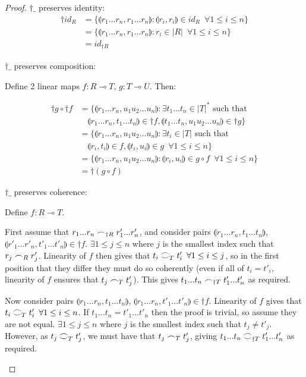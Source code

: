 \documentclass[11pt, oneside]{article}
\theoremstyle{plain}
\theoremstyle{definition}
\let\originaldagger\dagger
\renewcommand{\dag}{\mathord{\originaldagger}}
\newcommand{\lp}{\llparenthesis}
\newcommand{\rp}{\rrparenthesis}
\newcommand{\coh}[1][]{\mathrel{\vcenter{\offinterlineskip\hbox{$\frown$}\vskip0.2ex\hbox{$\smile$}}_{\ifx\\#1\\\else#1\fi}}}
\newcommand{\scoh}[1][]{\mathrel{\frown}_{\ifx\\#1\\\else#1\fi}}
\newcommand{\comp}{\mathbin{\circ}}
\begin{document}
\begin{proof}
    $\dag\_$ preserves identity:
    \begin{align*}
        \dag id_{R} &= \{\lp r_1...r_n,r_1...r_n\rp:\lp r_i,r_i\rp\in id_R\enspace\forall 1\le i\le n\} \\
        &= \{\lp r_1...r_n,r_1...r_n\rp:r_i\in |R|\enspace\forall 1\le i\le n\} \\
        &= id_{\dag R}
    \end{align*}

    $\dag\_$ preserves composition:
    \begin{adjustwidth}{1.5em}{}
        Define 2 linear maps $f:R\multimap T$, $g:T\multimap U$. Then:
    \end{adjustwidth}
    \begin{align*}
        \dag g\comp \dag f &= \{\lp r_1...r_n,u_1u_2...u_n\rp:\exists t_1...t_n\in|T|^* \text{ such that } \\
        &\quad\lp r_1...r_n,t_1...t_n\rp\in\dag f, \lp t_1...t_n,u_1u_2...u_n\rp\in\dag g\} \\
        &= \{\lp r_1...r_n,u_1u_2...u_n\rp:\exists t_i\in|T|\text{ such that } \\
        &\quad\lp r_i,t_i\rp\in f,\lp t_i,u_i\rp\in g\enspace\forall 1\le i\le n\} \\
        &= \{\lp r_1...r_n,u_1u_2...u_n\rp:\lp r_i,u_i\rp\in g\comp f \enspace\forall 1\le i\le n\} \\
        &= \dag(g\comp f)
    \end{align*}

    $\dag\_$ preserves coherence:
    \begin{adjustwidth}{1.5em}{}
        Define $f:R\multimap T$.

        First assume that $r_1...r_n\scoh[\dag R]r'_1...r'_n$, and consider pairs $\lp r_1...r_n,t_1...t_n\rp$, $\lp r'_1...r'_n,t'_1...t'_n\rp\in\dag f$.
        $\exists 1\le j\le n$ where $j$ is the smallest index such that $r_j\scoh[R]r'_j$.
        Linearity of $f$ then gives that $t_i\coh[T]t'_i\enspace\forall 1\le i\le j$, so in the first position that they differ they must do so coherently 
        (even if all of $t_i=t'_i$, linearity of $f$ ensures that $t_j\scoh[T]t'_j$).
        This gives $t_1...t_n\scoh[\dag T]t'_1...t'_n$ as required.

        Now consider pairs $\lp r_1...r_n,t_1...t_n\rp$, $\lp r_1...r_n,t'_1...t'_n\rp\in\dag f$.
        Linearity of $f$ gives that $t_i\coh[T]t'_i\enspace\forall1\le i\le n$.
        If $t_1...t_n=t'_1...t'_n$ then the proof is trivial, so assume they are not equal.
        $\exists 1\le j\le n$ where $j$ is the smallest index such that $t_j\neq t'_j$.
        However, as $t_j\coh[T]t'_j$, we must have that $t_j\scoh[T]t'_j$, giving $t_1...t_n\coh[\dag T]t'_1...t'_n$ as required.
    \end{adjustwidth}
\end{proof}
\end{document}
